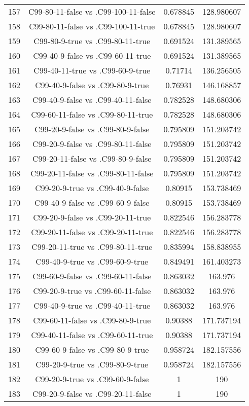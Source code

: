 \documentclass[a4paper,10pt]{article}
\begin{document}
\begin{landscape}
\begin{table}[!htp]
\begin{tabular}{cccc}
157&C99-80-11-false vs .C99-100-11-false&0.678845&128.980607\\
158&C99-80-11-false vs .C99-100-11-true&0.678845&128.980607\\
159&C99-80-9-true vs .C99-80-11-true&0.691524&131.389565\\
160&C99-40-9-false vs .C99-60-11-true&0.691524&131.389565\\
161&C99-40-11-true vs .C99-60-9-true&0.71714&136.256505\\
162&C99-40-9-false vs .C99-80-9-true&0.76931&146.168857\\
163&C99-40-9-false vs .C99-40-11-false&0.782528&148.680306\\
164&C99-60-11-false vs .C99-80-11-true&0.782528&148.680306\\
165&C99-20-9-false vs .C99-80-9-false&0.795809&151.203742\\
166&C99-20-9-false vs .C99-80-11-false&0.795809&151.203742\\
167&C99-20-11-false vs .C99-80-9-false&0.795809&151.203742\\
168&C99-20-11-false vs .C99-80-11-false&0.795809&151.203742\\
169&C99-20-9-true vs .C99-40-9-false&0.80915&153.738469\\
170&C99-40-9-false vs .C99-60-9-false&0.80915&153.738469\\
171&C99-20-9-false vs .C99-20-11-true&0.822546&156.283778\\
172&C99-20-11-false vs .C99-20-11-true&0.822546&156.283778\\
173&C99-20-11-true vs .C99-80-11-true&0.835994&158.838955\\
174&C99-40-9-true vs .C99-60-9-true&0.849491&161.403273\\
175&C99-60-9-false vs .C99-60-11-false&0.863032&163.976\\
176&C99-20-9-true vs .C99-60-11-false&0.863032&163.976\\
177&C99-40-9-true vs .C99-40-11-true&0.863032&163.976\\
178&C99-60-11-false vs .C99-80-9-true&0.90388&171.737194\\
179&C99-40-11-false vs .C99-60-11-true&0.90388&171.737194\\
180&C99-60-9-false vs .C99-80-9-true&0.958724&182.157556\\
181&C99-20-9-true vs .C99-80-9-true&0.958724&182.157556\\
182&C99-20-9-true vs .C99-60-9-false&1&190\\
183&C99-20-9-false vs .C99-20-11-false&1&190\\

\end{tabular}
\end{table}
\end{landscape}
\end{document}
